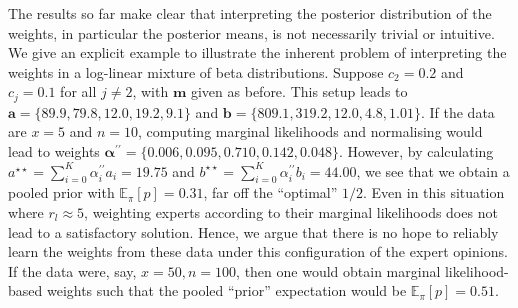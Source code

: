 \documentclass[12pt]{article}
\begin{document}
The results so far make clear that interpreting the posterior distribution of the weights, in particular the posterior means, is not necessarily trivial or intuitive.
We give an explicit example to illustrate the inherent problem of interpreting the weights in a log-linear mixture of beta distributions.
Suppose $c_2 = 0.2$ and $c_j = 0.1$ for all $j \neq 2$, with $\boldsymbol{m}$ given as before.
This setup leads to $\boldsymbol a = \{ 89.9, 79.8, 12.0, 19.2, 9.1\}$ and $\boldsymbol b = \{809.1, 319.2, 12.0, 4.8, 1.01\} $.
If the data are $x = 5$ and $n = 10$, computing marginal likelihoods and normalising would lead to weights $\boldsymbol\alpha^{\prime\prime} = \{0.006, 0.095, 0.710, 0.142, 0.048\}$.
However, by calculating $a^{\star\star} = \sum_{i = 0}^K \alpha_i^{\prime\prime} a_i = 19.75$ and $b^{\star\star} =  \sum_{i = 0}^K \alpha_i^{\prime\prime} b_i = 44.00$, we see that we obtain a pooled prior with $\mathbb{E}_\pi [p] =  0.31$, far off the ``optimal'' $1/2$.
Even in this situation where $r_l \approx 5$, weighting experts according to their marginal likelihoods does not lead to a satisfactory solution.
Hence, we argue that there is no hope to reliably learn the weights from these data under this configuration of the expert opinions.
If the data were, say, $x = 50, n = 100$, then one would obtain marginal likelihood-based weights such that the pooled ``prior'' expectation would be $\mathbb{E}_\pi [p] = 0.51$.
\end{document}
